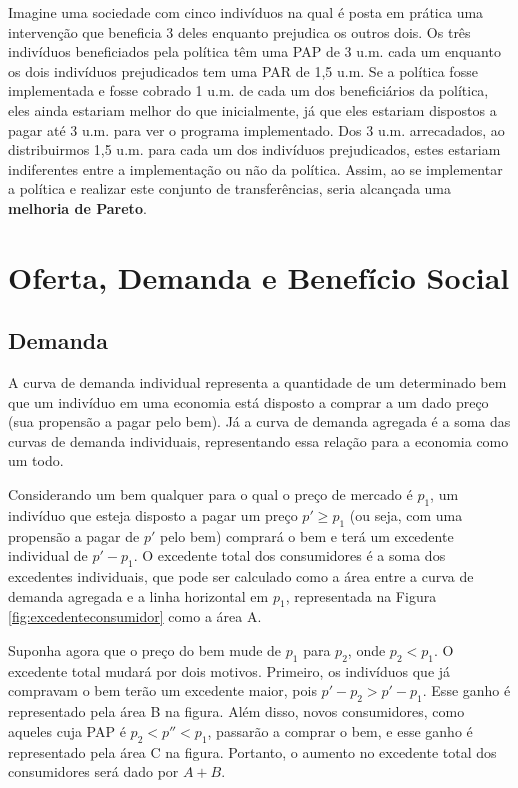 \documentclass[12pt,letterpaper]{article}
\newcommand{\1}{\mathbbm{1}}
\numberwithin{equation}{section}
\begin{document}
Imagine uma sociedade com cinco indivíduos na qual é posta em prática uma intervenção que beneficia 3 deles enquanto prejudica os outros dois. Os três indivíduos beneficiados pela política têm uma PAP de 3 u.m. cada um enquanto os dois indivíduos prejudicados tem uma PAR de 1,5 u.m. Se a política fosse implementada e fosse cobrado 1 u.m. de cada um dos beneficiários da política, eles ainda estariam melhor do que inicialmente, já que eles estariam dispostos a pagar até 3 u.m. para ver o programa implementado. Dos 3 u.m. arrecadados, ao distribuirmos 1,5 u.m. para cada um dos indivíduos prejudicados, estes estariam indiferentes entre a implementação ou não da política. Assim, ao se implementar a política e realizar este conjunto de transferências, seria alcançada uma \textbf{melhoria de Pareto}.

\section{Oferta, Demanda e Benefício Social}

\subsection{Demanda}

A curva de demanda individual representa a quantidade de um determinado bem que um indivíduo em uma economia está disposto a comprar a um dado preço (sua propensão a pagar pelo bem). Já a curva de demanda agregada é a soma das curvas de demanda individuais, representando essa relação para a economia como um todo.

Considerando um bem qualquer para o qual o preço de mercado é $p_{1}$, um indivíduo que esteja disposto a pagar um preço $p' \ge p_{1}$ (ou seja, com uma propensão a pagar de $p'$ pelo bem) comprará o bem e terá um excedente individual de $p' - p_{1}$. O excedente total dos consumidores é a soma dos excedentes individuais, que pode ser calculado como a área entre a curva de demanda agregada e a linha horizontal em $p_{1}$, representada na Figura \ref{fig:excedenteconsumidor} como a área A.

Suponha agora que o preço do bem mude de $p_{1}$ para $p_{2}$, onde $p_{2} < p_{1}$. O excedente total mudará por dois motivos. Primeiro, os indivíduos que já compravam o bem terão um excedente maior, pois $p' - p_{2} > p' - p_{1}$. Esse ganho é representado pela área B na figura. Além disso, novos consumidores, como aqueles cuja PAP é $p_{2} < p'' < p_{1}$, passarão a comprar o bem, e esse ganho é representado pela área C na figura. Portanto, o aumento no excedente total dos consumidores será dado por $A + B$.
\end{document}
